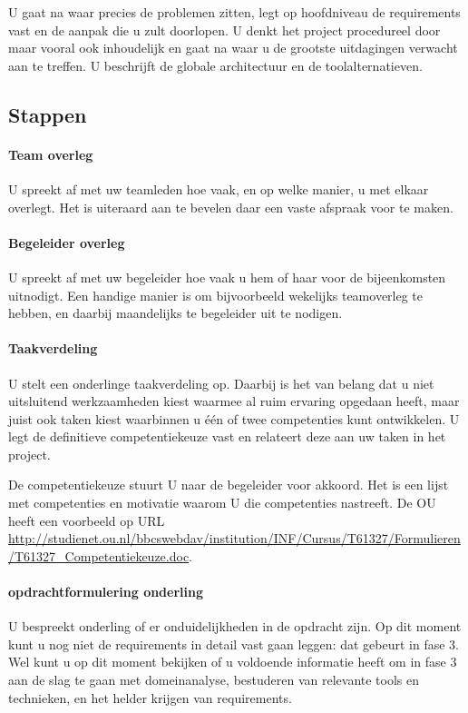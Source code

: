     U gaat na waar precies de problemen zitten, legt op hoofdniveau de
requirements vast en de aanpak die u zult doorlopen. U denkt het project
procedureel door maar vooral ook inhoudelijk en gaat na waar u de grootste
uitdagingen verwacht aan te treffen. U beschrijft de globale architectuur en de
toolalternatieven.

\subsection{Stappen}

\paragraph{Team overleg}
U spreekt af met uw teamleden hoe vaak, en op welke manier, u met elkaar
overlegt. Het is uiteraard aan te bevelen daar een vaste afspraak
voor te maken.

\paragraph{Begeleider overleg}
U spreekt af met uw begeleider hoe vaak u hem of haar voor de
bijeenkomsten uitnodigt. Een handige manier is om bijvoorbeeld
wekelijks teamoverleg te hebben, en daarbij maandelijks te begeleider uit te
nodigen.

\paragraph{Taakverdeling}
U stelt een onderlinge taakverdeling op. Daarbij is het van belang dat u
niet uitsluitend werkzaamheden kiest waarmee al ruim ervaring
opgedaan heeft, maar juist ook taken kiest waarbinnen u één of
twee competenties kunt ontwikkelen. U legt de definitieve competentiekeuze
vast en relateert deze aan uw taken in het project.

De competentiekeuze stuurt U naar de begeleider voor akkoord. Het is een lijst met
competenties en motivatie waarom U die competenties nastreeft. De OU heeft een voorbeeld
op URL \url{http://studienet.ou.nl/bbcswebdav/institution/INF/Cursus/T61327/Formulieren/T61327_Competentiekeuze.doc}.

\paragraph{opdrachtformulering onderling}
U bespreekt onderling of er onduidelijkheden in de opdracht zijn. Op dit
moment kunt u nog niet de requirements in detail vast gaan leggen:
dat gebeurt in fase 3. Wel kunt u op dit moment bekijken of u voldoende
informatie heeft om in fase 3 aan de slag te gaan met domeinanalyse,
bestuderen van relevante tools en technieken, en het helder krijgen
van requirements.

